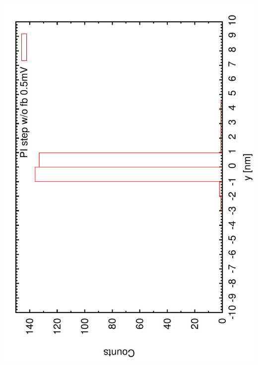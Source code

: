\documentclass[a4paper,11pt]{book}
\begin{document}
\includegraphics[angle=-90,scale=0.20]{imagestep21.pdf}
\end{document}
